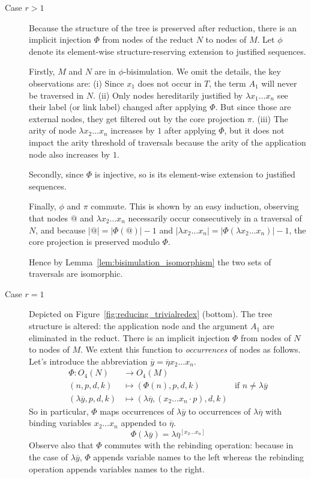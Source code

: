 \documentclass{elsarticle}
\theoremstyle{plain}
\theoremstyle{definition}
\theoremstyle{remark}
\def\coresymbol{\pi} %
\begin{document}
    \begin{description}
    \item[Case $r>1$] Because the structure of the tree is preserved after reduction, there is an implicit injection $\Phi$ from nodes of the reduct $N$ to nodes of $M$. Let $\phi$ denote its element-wise structure-reserving  extension to justified sequences.

    Firstly, $M$ and $N$ are in $\phi$-bisimulation. We omit the details, the key observations are:
    (i) Since $x_1$ does not occur in $T$, the term $A_1$ will never be traversed in $N$.
    (ii) Only nodes hereditarily justified by $\lambda x_1 \ldots x_n$ see their label (or link label) changed after applying $\Phi$. But since those are external nodes, they get filtered out by the core projection $\coresymbol$.
    (iii) The arity of node $\lambda x_2 \ldots x_n$ increases by $1$ after applying $\Phi$, but it does not impact the arity threshold of traversals because the arity of the application node also increases by $1$.

    Secondly, since $\Phi$ is injective, so is its element-wise extension to justified sequences.

    Finally, $\phi$ and $\coresymbol$ commute. This is shown by an easy induction, observing that nodes $@$ and $\lambda x_2\ldots x_n$ necessarily occur consecutively in a traversal of $N$, and because $|@| = |\Phi(@)| -1$ and $|\lambda x_2\ldots x_n| = |\Phi(\lambda x_2\ldots x_n)| - 1$, the core projection is preserved modulo $\Phi$.

    Hence by Lemma~\ref{lem:bisimulation_isomorphism} the two sets of traversals are isomorphic.

    \item[Case $r=1$] Depicted on Figure~\ref{fig:reducing_trivialredex} (bottom). The tree structure is altered: the application node and the argument $A_1$ are eliminated in the reduct. There is an implicit injection $\Phi$ from nodes of $N$ to nodes of $M$. We extent this function to \emph{occurrences} of nodes as follows. Let's introduce the abbreviation $\overline{y} = \overline\eta x_2 \ldots x_n$.
    \begin{align*}
        \Phi\colon O_4(N) &\rightarrow O_4(M) \\
        (n,p,d,k) &\longmapsto (\Phi(n),p,d,k) & \mbox{if $n\neq\lambda\overline{y}$} \\
        (\lambda\overline{y},p,d,k) &\longmapsto (\lambda\overline\eta,(x_2 \ldots x_n \cdot p),d,k)
    \end{align*}
    So in particular, $\Phi$ maps occurrences of $\lambda\overline{y}$ to occurrences of $\lambda\overline\eta$ with binding variables $x_2 \ldots x_n$ appended to $\overline\eta$.
    \begin{equation}
        \Phi(\lambda\overline{y})
        =
        \lambda\overline\eta^{[x_2\ldots x_n]}
        \label{eqn:phi_maps_lambday_to_lambdaeta}
    \end{equation}
    Observe also that $\Phi$ commutes with the rebinding operation: because in the case of $\lambda\overline{y}$, $\Phi$ appends variable names to the left whereas the rebinding operation appends variables names to the right.


\end{description}
\end{document}
